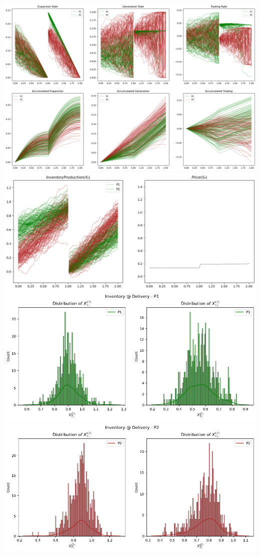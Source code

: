 \documentclass[
]{article}
\begin{document}
\includegraphics{Illustration_Diagrams/Seprt-2A2P-Sigmoid-ResExamples/Rates.png}
\includegraphics{Illustration_Diagrams/Seprt-2A2P-Sigmoid-ResExamples/AccumRates.png}
\includegraphics{Illustration_Diagrams/Seprt-2A2P-Sigmoid-ResExamples/InvAndPrice.png}
\includegraphics{Illustration_Diagrams/Seprt-2A2P-Sigmoid-ResExamples/InvPreDeli_P1.png}
\includegraphics{Illustration_Diagrams/Seprt-2A2P-Sigmoid-ResExamples/InvPreDeli_P2.png}
\end{document}

